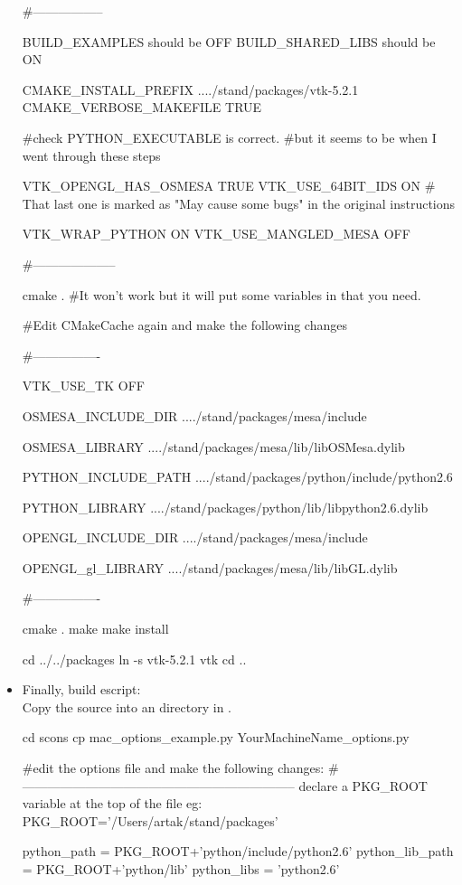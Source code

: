 \begin{itemize}
\begin{shellCode}
#-----------------

BUILD_EXAMPLES should be OFF
BUILD_SHARED_LIBS should be ON

CMAKE_INSTALL_PREFIX	..../stand/packages/vtk-5.2.1
CMAKE_VERBOSE_MAKEFILE	TRUE

#check PYTHON_EXECUTABLE is correct.
#but it seems to be when I went through these steps

VTK_OPENGL_HAS_OSMESA	TRUE
VTK_USE_64BIT_IDS	ON
# That last one is marked as "May cause some bugs" in the original instructions

VTK_WRAP_PYTHON	ON
VTK_USE_MANGLED_MESA	OFF

#--------------------

cmake .
#It won't work but it will put some variables in that you need.

#Edit CMakeCache again and make the following changes

#----------------

VTK_USE_TK	OFF

OSMESA_INCLUDE_DIR	..../stand/packages/mesa/include

OSMESA_LIBRARY	..../stand/packages/mesa/lib/libOSMesa.dylib

PYTHON_INCLUDE_PATH	..../stand/packages/python/include/python2.6

PYTHON_LIBRARY	..../stand/packages/python/lib/libpython2.6.dylib

OPENGL_INCLUDE_DIR	..../stand/packages/mesa/include

OPENGL_gl_LIBRARY	..../stand/packages/mesa/lib/libGL.dylib

#----------------

cmake .
make
make install


cd ../../packages
ln -s vtk-5.2.1 vtk
cd ..
\end{shellCode}

\item Finally, build escript:\\
Copy the \esfinley source into an  directory in .

\begin{shellCode}
cd scons
cp mac_options_example.py YourMachineName_options.py

#edit the options file and make the following changes:
#-----------------------------------------------------------------
declare a PKG_ROOT variable at the top of the file eg:
PKG_ROOT='/Users/artak/stand/packages'

python_path		= PKG_ROOT+'python/include/python2.6'
python_lib_path		= PKG_ROOT+'python/lib'
python_libs		= 'python2.6'


\end{shellCode}
\end{itemize}
